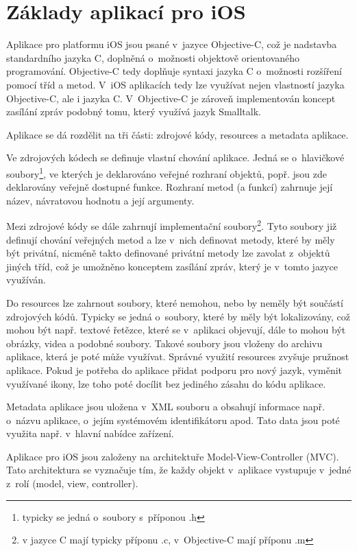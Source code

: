 \documentclass[thesis=B,czech]{FITthesis}[2012/06/26]
\begin{document}
	\section{Základy aplikací pro iOS}

	Aplikace pro platformu iOS jsou psané v~jazyce Objective-C, což je nadstavba standardního jazyka C, doplněná o~možnosti objektově orientovaného programování. Objective-C tedy doplňuje syntaxi jazyka C o~možnosti rozšíření pomocí tříd a metod. V~iOS aplikacích tedy lze využívat nejen vlastností jazyka Objective-C, ale i jazyka C. V~Objective-C je zároveň implementován koncept zasílání zpráv podobný tomu, který využívá jazyk Smalltalk. \cite{aboutObjCOnline}

	Aplikace se dá rozdělit na tři části: zdrojové kódy, resources a metadata aplikace.

	Ve zdrojových kódech se definuje vlastní chování aplikace. Jedná se o~hlavičkové soubory\footnote{typicky se jedná o~soubory s~příponou .h}, ve kterých je deklarováno veřejné rozhraní objektů, popř. jsou zde deklarovány veřejně dostupné funkce. Rozhraní metod (a funkcí) zahrnuje její název, návratovou hodnotu a její argumenty.

	Mezi zdrojové kódy se dále zahrnují implementační soubory\footnote{v jazyce C mají typicky příponu .c, v~Objective-C mají příponu .m}. Tyto soubory již definují chování veřejných metod a lze v~nich definovat metody, které by měly být privátní, nicméně takto definované privátní metody lze zavolat z~objektů jiných tříd, což je umožněno konceptem zasílání zpráv, který je v~tomto jazyce využíván.

	Do resources lze zahrnout soubory, které nemohou, nebo by neměly být součástí zdrojových kódů. Typicky se jedná o~soubory, které by měly být lokalizovány, což mohou být např. textové řetězce, které se v~aplikaci objevují, dále to mohou být obrázky, videa a podobné soubory. Takové soubory jsou vloženy do archivu aplikace, která je poté může využívat. Správné využití resources zvyšuje pružnost aplikace. Pokud je potřeba do aplikace přidat podporu pro nový jazyk, vyměnit využívané ikony, lze toho poté docílit bez jediného zásahu do kódu aplikace.

	Metadata aplikace jsou uložena v~XML souboru a obsahují informace např. o~názvu aplikace, o~jejím systémovém identifikátoru apod. Tato data jsou poté využita např. v~hlavní nabídce zařízení. \cite{plistKeysOnline}

	Aplikace pro iOS jsou založeny na architektuře Model-View-Controller (MVC). Tato architektura se vyznačuje tím, že každy objekt v~aplikace vystupuje v~jedné z~rolí (model, view, controller). \cite{appleMVCOnline}
\end{document}
